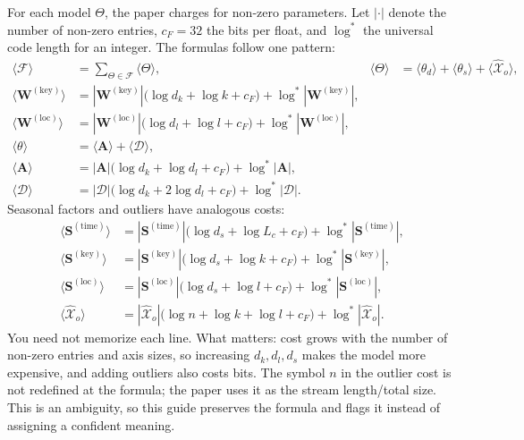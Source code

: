 For each model $\Theta$, the paper charges for non-zero parameters. Let $|\cdot|$ denote the number of
non-zero entries, $c_F=32$ the bits per float, and $\log^*$ the universal code length for an integer.
The formulas follow one pattern:
\begin{align}
  \bigl\langle\mathcal{F}\bigr\rangle
  &=\sum_{\Theta\in\mathcal{F}}\bigl\langle\Theta\bigr\rangle,
  &
  \bigl\langle\Theta\bigr\rangle
  &=\bigl\langle\theta_d\bigr\rangle
   +\bigl\langle\theta_s\bigr\rangle
   +\bigl\langle\widehat{\mathcal{X}}_o\bigr\rangle,
  \label{eq:model-cost}\\
  \bigl\langle\mathbf{W}^{(\mathrm{key})}\bigr\rangle
  &=|\mathbf{W}^{(\mathrm{key})}|
    \bigl(\log d_k+\log k+c_F\bigr)
    +\log^*|\mathbf{W}^{(\mathrm{key})}|,
  \label{eq:cost-wkey}\\
  \bigl\langle\mathbf{W}^{(\mathrm{loc})}\bigr\rangle
  &=|\mathbf{W}^{(\mathrm{loc})}|
    \bigl(\log d_l+\log l+c_F\bigr)
    +\log^*|\mathbf{W}^{(\mathrm{loc})}|,\\
  \bigl\langle\theta\bigr\rangle
  &=\bigl\langle\mathbf{A}\bigr\rangle
   +\bigl\langle\mathcal{D}\bigr\rangle,\\
  \bigl\langle\mathbf{A}\bigr\rangle
  &=|\mathbf{A}|\bigl(\log d_k+\log d_l+c_F\bigr)
    +\log^*|\mathbf{A}|,\\
  \bigl\langle\mathcal{D}\bigr\rangle
  &=|\mathcal{D}|\bigl(\log d_k+2\log d_l+c_F\bigr)
    +\log^*|\mathcal{D}|.
  \label{eq:cost-theta}
\end{align}
Seasonal factors and outliers have analogous costs:
\begin{align}
  \bigl\langle\mathbf{S}^{(\mathrm{time})}\bigr\rangle
  &=|\mathbf{S}^{(\mathrm{time})}|
    \bigl(\log d_s+\log L_c+c_F\bigr)
    +\log^*|\mathbf{S}^{(\mathrm{time})}|,\\
  \bigl\langle\mathbf{S}^{(\mathrm{key})}\bigr\rangle
  &=|\mathbf{S}^{(\mathrm{key})}|
    \bigl(\log d_s+\log k+c_F\bigr)
    +\log^*|\mathbf{S}^{(\mathrm{key})}|,\\
  \bigl\langle\mathbf{S}^{(\mathrm{loc})}\bigr\rangle
  &=|\mathbf{S}^{(\mathrm{loc})}|
    \bigl(\log d_s+\log l+c_F\bigr)
    +\log^*|\mathbf{S}^{(\mathrm{loc})}|,\\
  \bigl\langle\widehat{\mathcal{X}}_o\bigr\rangle
  &=|\widehat{\mathcal{X}}_o|
    \bigl(\log n+\log k+\log l+c_F\bigr)
    +\log^*|\widehat{\mathcal{X}}_o|.
  \label{eq:cost-outlier}
\end{align}
You need not memorize each line. What matters: cost grows with the number of non-zero entries and axis
sizes, so increasing $d_k,d_l,d_s$ makes the model more expensive, and adding outliers also costs bits.
The symbol $n$ in the outlier cost is not redefined at the formula; the paper uses it as the stream
length/total size. This is an ambiguity, so this guide preserves the formula and flags it instead of
assigning a confident meaning.

